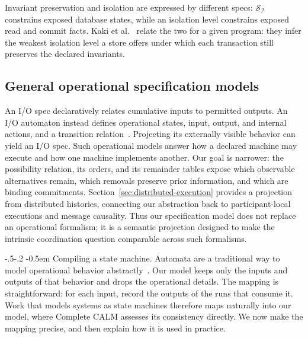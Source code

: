 \documentclass[sigconf]{cidr-2027}
\makeatletter
\theoremstyle{remark}
\renewcommand\paragraph{\@startsection{paragraph}{4}{\z@}%
  {-.5\baselineskip \@plus -2\p@ \@minus -.2\p@}%
  {-0.5em}%
  {\normalfont\bfseries}}
\newcommand{\commitments}{commitments\xspace}
\newcommand{\Spec}{\mathcal{S}}
\makeatother
\begin{document}
\color{blue!70!black}Invariant preservation and isolation are expressed by different specs: $\Spec_{\mathcal I}$ constrains exposed database states, while an
isolation level constrains exposed read and commit facts.  Kaki et
al.~\cite{kaki2018alone} relate the two for a given program: they infer the
weakest isolation level a store offers under which each transaction still
preserves the declared invariants.\color{black}

\subsection{General operational specification models}
\label{sec:operational-models}
An I/O spec declaratively relates cumulative inputs to permitted
outputs.  An I/O automaton instead defines operational states, input, output,
and internal actions, and a transition relation~\cite{lynch1987io,lynch1996distributed}.
Projecting its externally visible behavior can yield an I/O spec.
Such operational models answer how a declared machine may execute and how one
machine implements another.  Our goal is narrower: the possibility relation,
its orders, and its remainder tables expose which observable alternatives
remain, which removals preserve prior information, and which are binding
\commitments.  Section~\ref{sec:distributed-execution} provides a projection
from distributed histories, connecting our abstraction back to
participant-local executions and message causality.  Thus our specification
model does not replace an operational formalism; it is a semantic projection
designed to make the intrinsic coordination question comparable across such
formalisms.

\paragraph{Compiling a state machine.}
Automata are a traditional way to model operational behavior
abstractly~\cite{lynch1987io,lynch1996distributed}.  Our model keeps only the
inputs and outputs of that behavior and drops the operational details.  The
mapping is straightforward: for each input, record the outputs of the runs that
consume it.  Work that models systems as state machines therefore maps
naturally into our model, where Complete CALM assesses its consistency
directly.  We now make the mapping precise, and then explain how it is used in
practice.
\end{document}
